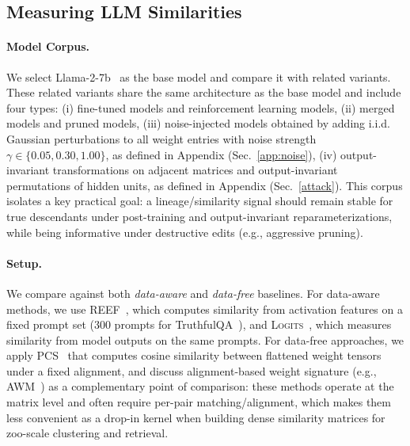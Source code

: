\subsection{Measuring LLM Similarities}\label{sec:result_llm_lineage}

\paragraph{Model Corpus.} 
We select Llama-2-7b~\cite{touvron2023llama2openfoundation} as the base model and compare it with related variants. These related variants share the same architecture as the base model and include four types:
(i) fine-tuned models and reinforcement learning models,
(ii) merged models and pruned models,
(iii) noise-injected models obtained by adding i.i.d. Gaussian perturbations to all weight entries with noise strength $\gamma \in \{0.05,0.30,1.00\}$, as defined in Appendix (Sec.~\ref{app:noise}),
(iv) output-invariant transformations on adjacent matrices and output-invariant permutations of hidden units, as defined in Appendix (Sec.~\ref{attack}). This corpus isolates a key practical goal: a lineage/similarity signal should remain stable for true descendants under post-training and output-invariant reparameterizations, while being informative under destructive edits (e.g., aggressive pruning).

\paragraph{Setup.}
We compare against both \emph{data-aware} and \emph{data-free} baselines. For data-aware methods, we use \textsc{REEF}~\cite{zhang2025reef}, which computes similarity from activation features on a fixed prompt set (300 prompts for TruthfulQA~\cite{lin2022truthfulqa}), and \textsc{Logits}~\cite{Yang2024AFF}, which measures similarity from model outputs on the same prompts. For data-free approaches, we apply \textsc{PCS}~\cite{zeng2024HuRef} that computes cosine similarity between flattened weight tensors under a fixed alignment, and discuss alignment-based weight signature (e.g., \textsc{AWM}~\cite{zeng2025awm}) as a complementary point of comparison: these methods operate at the matrix level and often require per-pair matching/alignment, which makes them less convenient as a drop-in kernel when building dense similarity matrices for zoo-scale clustering and retrieval.

